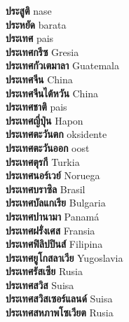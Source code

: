 \textbf{ ประสูติ  } nase \\
\textbf{ ประหยัด  } barata \\
\textbf{ ประเทศ  } pais \\
\textbf{ ประเทศกรีซ  } Gresia \\
\textbf{ ประเทศกัวเตมาลา  } Guatemala \\
\textbf{ ประเทศจีน  } China \\
\textbf{ ประเทศจีนไต้หวัน  } China \\
\textbf{ ประเทศชาติ  } pais \\
\textbf{ ประเทศญี่ปุ่น  } Hapon \\
\textbf{ ประเทศตะวันตก  } oksidente \\
\textbf{ ประเทศตะวันออก  } oost \\
\textbf{ ประเทศตุรกี  } Turkia \\
\textbf{ ประเทศนอร์เวย์  } Noruega \\
\textbf{ ประเทศบราซิล  } Brasil \\
\textbf{ ประเทศบัลแกเรีย  } Bulgaria \\
\textbf{ ประเทศปานามา  } Panamá \\
\textbf{ ประเทศฝรั่งเศส  } Fransia \\
\textbf{ ประเทศฟิลิปปินส์  } Filipina \\
\textbf{ ประเทศยูโกสลาเวีย  } Yugoslavia \\
\textbf{ ประเทศรัสเซีย  } Rusia \\
\textbf{ ประเทศสวิส  } Suisa \\
\textbf{ ประเทศสวิสเซอร์แลนด์  } Suisa \\
\textbf{ ประเทศสหภาพโซเวียต  } Rusia \\

